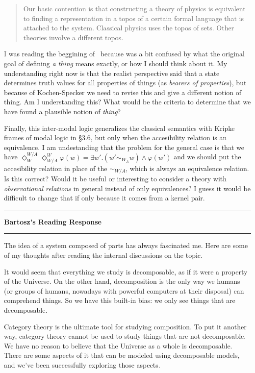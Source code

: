 \documentclass{amsart}
\newcommand{\iam}[1]{
  \vspace{0.25em}
  \hrule
  \vspace{0.25em}
  \textbf{{#1}'s Reading Response}
  \vspace{0.25em}
  \hrule
  \vspace{1em}
}
\begin{document}
\begin{quote}
  Our basic contention is that constructing a theory of physics
  is equivalent to finding a representation in a topos of a certain
  formal language that is attached to the system. Classical physics
  uses the topos of sets. Other theories involve a different topos.
\end{quote}

I was reading the beggining of~\cite{whatIsAThingDoering} because was a bit confused by
what the original goal of defining \textit{a thing} means exactly, or how
I should think about it.
My understanding right now is that the realist perspective
said that a state determines truth values for all properties of things
(as \textit{bearers of properties}), but because of Kochen-Specker we
need to revise this and give a different notion of thing. Am I
understanding this? What would be the criteria to determine that we
have found a plausible notion of \textit{thing}?

Finally, this inter-modal logic generalizes the classical semantics
with Kripke frames of modal logic in \S 3.6, but only when the
accesibility relation is an equivalence. I am undestanding that the
problem for the general case is that we have
$\Diamond_W^{W/A}\Diamond_{W/A}^W \varphi (w) = \exists w'. (w'
\sim_{W_{A}} w) \wedge \varphi(w')$ and we should put the accesibility
relation in place of the $\sim_{W/A}$, which is always an equivalence
relation.  Is this correct? Would it be useful or interesting to
consider a theory with \textit{observational relations} in general
instead of only equivalences? I guess it would be difficult to change
that if only because it comes from a kernel pair.

\iam{Bartosz}

The idea of a system composed of parts has always fascinated me. Here are some of my thoughts after reading the internal discussions on the topic.

It would seem that everything we study is decomposable, as if it were a property of the Universe. On the other hand, decomposition is the only way we humans (or groups of humans, nowadays with powerful computers at their disposal) can comprehend things. So we have this built-in bias: we only see things that are decomposable.

Category theory is the ultimate tool for studying composition. To put it another way, category theory cannot be used to study things that are not decomposable. We have no reason to believe that the Universe as a whole is decomposable. There are some aspects of it that can be modeled using decomposable models, and we've been successfully exploring those aspects.
\end{document}
